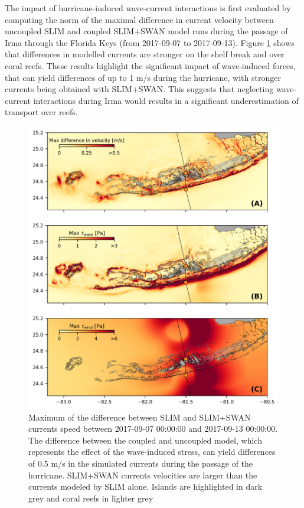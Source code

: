 \documentclass[11pt,a4paper]{article}
\begin{document}
The impact of hurricane-induced wave-current interactions is first evaluated by computing the norm of the maximal difference in current velocity between uncoupled SLIM and coupled SLIM+SWAN model runs during the passage of Irma through the Florida Keys (from 2017-09-07 to 2017-09-13). Figure \ref{fig:diff} shows that differences in modelled currents are stronger on the shelf break and over coral reefs. These results highlight the significant impact of wave-induced forces, that can yield differences of up to 1 m/s during the hurricane, with stronger currents being obtained with SLIM+SWAN. This suggests that neglecting wave-current interactions during Irma would results in a significant underestimation of transport over reefs.

\begin{figure}
    \centering
    \includegraphics[width=.95\textwidth]{fig/max_diff_reefs.png}
    \caption{Maximum of the difference between SLIM and SLIM+SWAN currents speed between 2017-09-07 00:00:00 and 2017-09-13 00:00:00. The difference between the coupled and uncoupled model, which represents the effect of the wave-induced stress, can yield differences of 0.5 m/s in the simulated currents during the passage of the hurricane. SLIM+SWAN currents velocities are larger than the currents modeled by SLIM alone. Islands are highlighted in dark grey and coral reefs in lighter grey}
    \label{fig:diff}
\end{figure}
\end{document}
